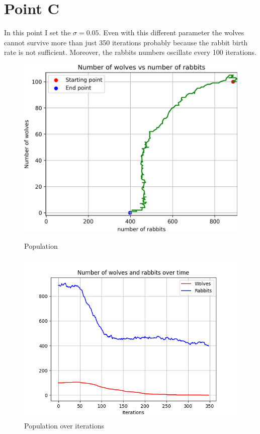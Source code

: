\documentclass[unicode,11pt,a4paper,oneside,numbers=endperiod,openany]{scrartcl}
\begin{document}
\section*{Point C}
In this point I set the $\sigma=0.05$. Even with this different parameter the wolves cannot survive more than just 350 iterations probably because the rabbit birth rate is not sufficient. Moreover, the rabbits numbers oscillate every 100 iterations. 
\begin{figure}[H]
  \centering
  \begin{minipage}[b]{0.435\textwidth}
    \centering
    \includegraphics[width=\textwidth]{output_main/PointCnew_populations.png}
    \caption{Population}
  \end{minipage}
  \hfill
  \begin{minipage}[b]{0.49\textwidth}
    \centering
    \includegraphics[width=\textwidth]{output_main/PointCnew.png}
    \caption{Population over iterations}
  \end{minipage}
\end{figure}
\end{document}

